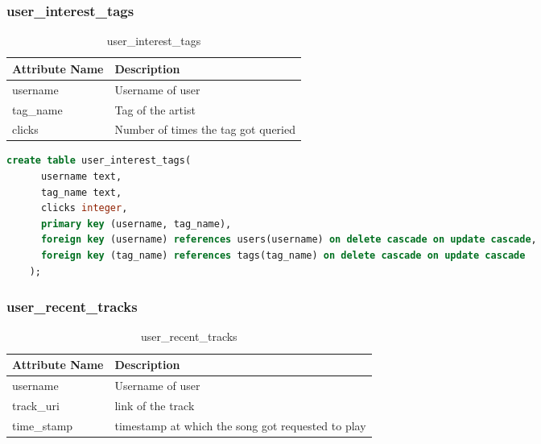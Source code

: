 \documentclass[10pt]{article}
\begin{document}
\subsubsection{user\_interest\_tags}
\begin{table}[!ht]
    \centering
    \begin{tabular}{|l|l|}
         \hline
         \textbf{Attribute Name} & \textbf{Description} \\
         \hline
         username & Username of user\\
         \hline
         tag\_name &  Tag of the artist\\
         \hline
         clicks &  Number of times the tag got queried\\
         \hline         
    \end{tabular}
    \caption{user\_interest\_tags}
    \label{tab:my_label9}
\end{table}

\begin{lstlisting}[language=SQL,
        deletekeywords={IDENTITY,INT},
        morekeywords={clustered},    
        framesep=10pt,
        framextopmargin=10pt]
    create table user_interest_tags(
      username text,
      tag_name text,
      clicks integer,
      primary key (username, tag_name),
      foreign key (username) references users(username) on delete cascade on update cascade,
      foreign key (tag_name) references tags(tag_name) on delete cascade on update cascade
    );
\end{lstlisting}

\subsubsection{user\_recent\_tracks}
\begin{table}[!ht]
    \centering
    \begin{tabular}{|l|l|}
         \hline
         \textbf{Attribute Name} & \textbf{Description} \\
         \hline
         username & Username of user\\
         \hline
         track\_uri &  link of the track\\
         \hline
         time\_stamp &  timestamp at which the song got requested to play\\
         \hline         
    \end{tabular}
    \caption{user\_recent\_tracks}
    \label{tab:my_label10}
\end{table}
\end{document}
